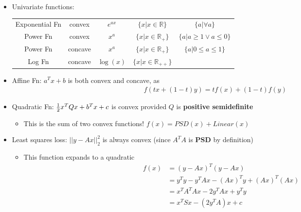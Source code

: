 \documentclass{article}
\begin{document}
\begin{headered_note}
  \begin{itemize}
    \item Univariate functions:\\
          \vpush
          \begin{tabular}{ c | c | c | c | c }
            Exponential Fn & convex  & $e^{ax}$  & $\{x|x\in \mathbb{R}\}$      & $\{a|\forall a\}$             \\
            Power Fn       & convex  & $x^a$     & $\{x|x\in \mathbb{R}_+\}$    & $\{a|a\geq 1 \lor a \leq 0\}$ \\
            Power Fn       & concave & $x^a$     & $\{x|x\in \mathbb{R}_+\}$    & $\{a|0\leq a\leq 1\}$         \\
            Log Fn         & concave & $\log(x)$ & $\{x|x\in \mathbb{R}_{++}\}$ &                               \\
          \end{tabular}
    \item Affine Fn: $a^Tx+b$ is both convex and concave, as
          \begin{align}
            f(tx+(1-t)y)=tf(x)+(1-t)f(y)
          \end{align}
    \item Quadratic Fn: ${1\over 2}x^TQx+b^Tx+c$ is convex provided $Q$ is \textbf{positive semidefinite}
          \begin{itemize}
            \item This is the sum of two convex functions! $f(x)=PSD(x)+Linear(x)$
          \end{itemize}
    \item Least squares loss: $||y-Ax||^2_2$ is always convex (since $A^TA$ is \textbf{PSD} by definition)
          \begin{itemize}
            \item This function expands to a quadratic
                  \begin{align*}
                    f(x) & =\left(y-Ax\right)^T\left(y-Ax\right) \\
                         & =y^Ty-y^TAx-(Ax)^Ty+(Ax)^T(Ax)        \\
                         & =x^TA^TAx-2y^TAx+y^Ty                 \\
                         & =x^TSx-(2y^TA)x+c
                  \end{align*}
          \end{itemize}
  \end{itemize}
\end{headered_note}
\end{document}
